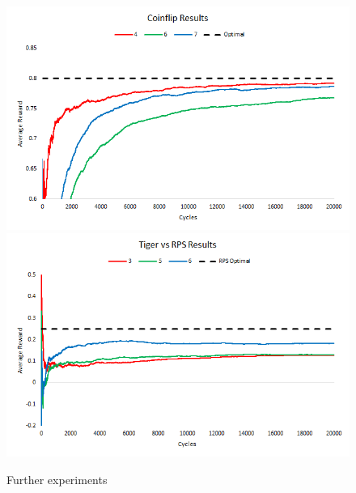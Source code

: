 \documentclass[paper=a4, fontsize=11pt]{scrartcl} %
\numberwithin{equation}{section} %
\numberwithin{figure}{section} %
\numberwithin{table}{section} %
\begin{document}
\begin{figure}
\includegraphics[width=\textwidth]{plots/coinflip_tests1}
\includegraphics[width=\textwidth]{plots/rps_tiger_1}
\caption{\label{plot:cointests}Further experiments}
\end{figure}
\end{document}
